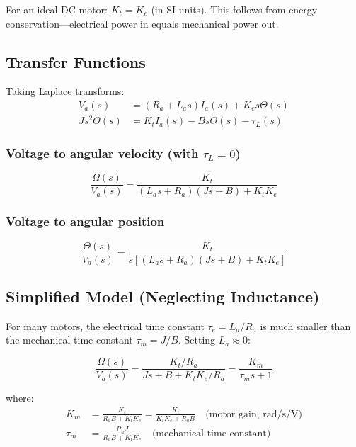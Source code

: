 \begin{keyconceptbox}[title=Motor Constants]
For an ideal DC motor: $K_t = K_e$ (in SI units). This follows from energy conservation---electrical power in equals mechanical power out.
\end{keyconceptbox}

\subsection{Transfer Functions}

Taking Laplace transforms:
\begin{align}
V_a(s) &= (R_a + L_a s)I_a(s) + K_e s\Theta(s) \\
Js^2\Theta(s) &= K_t I_a(s) - Bs\Theta(s) - \tau_L(s)
\end{align}

\subsubsection{Voltage to angular velocity (with $\tau_L = 0$)}
\begin{equation}
\frac{\Omega(s)}{V_a(s)} = \frac{K_t}{(L_a s + R_a)(Js + B) + K_t K_e}
\end{equation}

\subsubsection{Voltage to angular position}
\begin{equation}
\frac{\Theta(s)}{V_a(s)} = \frac{K_t}{s[(L_a s + R_a)(Js + B) + K_t K_e]}
\end{equation}

\subsection{Simplified Model (Neglecting Inductance)}

For many motors, the electrical time constant $\tau_e = L_a/R_a$ is much smaller than the mechanical time constant $\tau_m = J/B$. Setting $L_a \approx 0$:

\begin{equation}
\frac{\Omega(s)}{V_a(s)} = \frac{K_t/R_a}{Js + B + K_t K_e/R_a} = \frac{K_m}{\tau_m s + 1}
\end{equation}

where:
\begin{align}
K_m &= \frac{K_t}{R_a B + K_t K_e} = \frac{K_t}{K_t K_e + R_a B} \quad \text{(motor gain, rad/s/V)} \\
\tau_m &= \frac{R_a J}{R_a B + K_t K_e} \quad \text{(mechanical time constant)}
\end{align}

